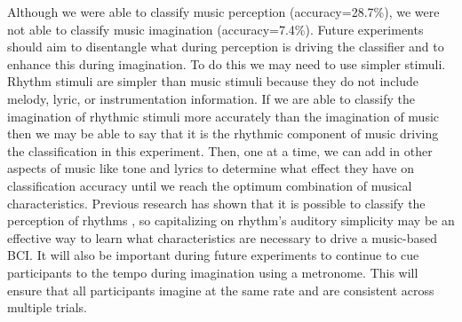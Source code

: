 Although we were able to classify music perception (accuracy=28.7\%), we were not able to classify music imagination (accuracy=7.4\%).
Future experiments should aim to disentangle what during perception is driving the classifier and to enhance this during imagination.
To do this we may need to use simpler stimuli.
Rhythm stimuli are simpler than music stimuli because they do not include melody, lyric, or instrumentation information. 
If we are able to classify the imagination of rhythmic stimuli more accurately than the imagination of music then we may be able to say that it is the rhythmic component of music driving the classification in this experiment.
Then, one at a time, we can add in other aspects of music like tone and lyrics to determine what effect they have on classification accuracy until we reach the optimum combination of musical characteristics.
Previous research has shown that it is possible to classify the perception of rhythms \cite{stober2014audiomostly}, so capitalizing on rhythm's auditory simplicity may be an effective way to learn what characteristics are necessary to drive a music-based \ac{BCI}.
It will also be important during future experiments to continue to cue participants to the tempo during imagination using a metronome.
This will ensure that all participants imagine at the same rate and are consistent across multiple trials.